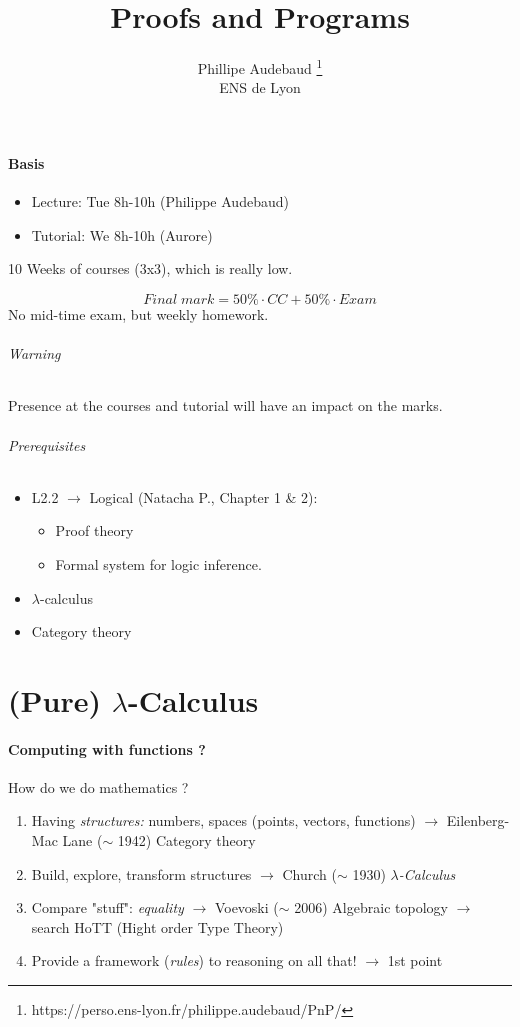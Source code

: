 \documentclass{article}
\title{Proofs and Programs}
\author{Phillipe Audebaud \footnote{https://perso.ens-lyon.fr/philippe.audebaud/PnP/}\\
\small ENS de Lyon}
\date{}
\begin{document}
\maketitle
\tableofcontents
\newpage

\subsection*{Basis}
\begin{itemize}
\item Lecture: Tue 8h-10h (Philippe Audebaud)
\item Tutorial: We 8h-10h (Aurore)
\end{itemize}
10 Weeks of courses (3x3), which is really low.

\[Final\;mark = 50\% \cdot CC + 50\% \cdot Exam\]
No mid-time exam, but weekly homework.

\paragraph{Warning} Presence at the courses and tutorial will have an impact on the marks.

\paragraph{Prerequisites}
\begin{itemize}
\item L2.2 $\to$ Logical (Natacha P., Chapter 1 \& 2): 
\begin{itemize}
\item Proof theory
\item Formal system for logic inference.
\end{itemize}
\item $\lambda$-calculus
\item Category theory
\end{itemize}

\setcounter{section}{0}
\part{(Pure) $\lambda$-Calculus}
\subsection{Computing with functions ?}
How do we do mathematics ?
\begin{enumerate}[label=\Alph*.]
\item Having \emph{structures:} numbers, spaces (points, vectors, functions) $\to$ Eilenberg-Mac Lane ($\sim$ 1942) Category theory
\item Build, explore, transform structures $\to$ Church ($\sim$ 1930) \emph{$\lambda$-Calculus}
\item Compare "stuff": \emph{equality} $\to$ Voevoski ($\sim$ 2006) Algebraic topology $\to$ search HoTT (Hight order Type Theory)
\item Provide a framework (\emph{rules}) to reasoning on all that! $\to$ 1st point
\end{enumerate}
\end{document}
